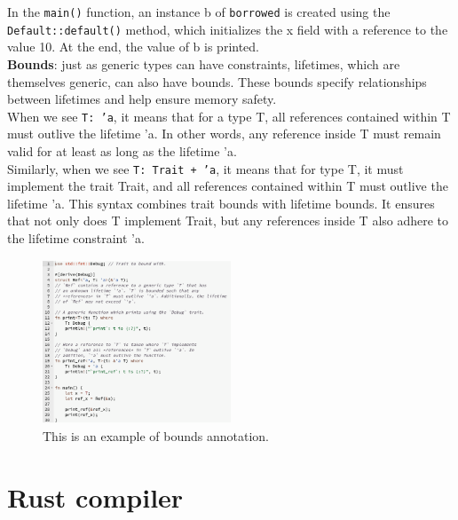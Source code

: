 \documentclass{article}
\begin{document}
In the \texttt{main()} function, an instance b of \texttt{borrowed} is created using the \texttt{Default::default()} method, which initializes the x field with a reference to the value 10.
At the end, the value of b is printed.
\\
\textbf{Bounds}: just as generic types can have constraints, lifetimes, which are themselves generic, can also have bounds. These bounds specify relationships between lifetimes and help ensure memory safety.\\
When we see \texttt{T: 'a}, it means that for a type T, all references contained within T must outlive the lifetime 'a. In other words, any reference inside T must remain valid for at least as long as the lifetime 'a.
\\
Similarly, when we see \texttt{T: Trait + 'a}, it means that for type T, it must implement the trait Trait, and all references contained within T must outlive the lifetime 'a. This syntax combines trait bounds with lifetime bounds. It ensures that not only does T implement Trait, but any references inside T also adhere to the lifetime constraint 'a.
\\
\begin{figure}[h]
  \centering
  \includegraphics[width=0.5\textwidth]{images/Bounds.png} 
  \caption{This is an example of bounds annotation.}
  \label{fig:bounds_example}
\end{figure}


















\section{Rust compiler}
\end{document}
